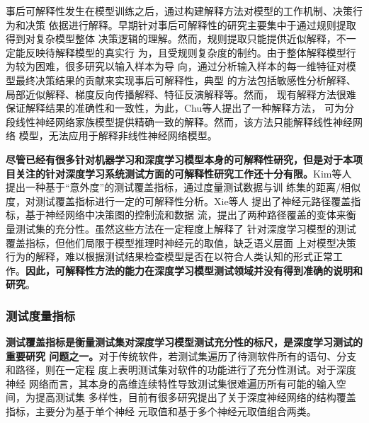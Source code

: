 事后可解释性发生在模型训练之后，通过构建解释方法对模型的工作机制、决策行为和决策
依据进行解释。早期针对事后可解释性的研究主要集中于通过规则提取得到对复杂模型整体
决策逻辑的理解。然而，规则提取只能提供近似解释，不一定能反映待解释模型的真实行
为，且受规则复杂度的制约。由于整体解释模型行为较为困难，很多研究以输入样本为导
向，通过分析输入样本的每一维特征对模型最终决策结果的贡献来实现事后可解释性，典型
的方法包括敏感性分析解释、局部近似解释、梯度反向传播解释、特征反演解释等。然而，
现有解释方法很难保证解释结果的准确性和一致性，为此，Chu等人提出了一种解释方法，
可为分段线性神经网络家族模型提供精确一致的解释。然而，该方法只能解释线性神经网络
模型，无法应用于解释非线性神经网络模型。

\textbf{尽管已经有很多针对机器学习和深度学习模型本身的可解释性研究，但是对于本项
目关注的针对深度学习系统测试方面的可解释性研究工作还十分有限。}Kim等人
提出一种基于“意外度”的测试覆盖指标，通过度量测试数据与训
练集的距离/相似度，对测试覆盖指标进行一定的可解释性分析。Xie等人
提出了神经元路径覆盖指标，基于神经网络中决策图的控制流和数据
流，提出了两种路径覆盖的变体来衡量测试集的充分性。虽然这些方法在一定程度上解释了
针对深度学习模型的测试覆盖指标，但他们局限于模型推理时神经元的取值，缺乏语义层面
上对模型决策行为的解释，难以根据测试结果检查模型是否在以符合人类认知的形式正常工
作。\textbf{因此，可解释性方法的能力在深度学习模型测试领域并没有得到准确的说明和
研究}。

\iffalse
\textbf{尽管已经有很多针对机器学习和深度学习模型本身的可解释性研究，但是对于本项
目关注的针对深度学习系统测试方面的可解释性研究工作还十分有限。}Kim等人
\citess{Kim2019Guiding}提出一种基于“意外度”的测试覆盖指标，通过度量测试数据与训
练集的不同距离，评估测试集对样本输入空间的覆盖度，从而对测试目标进行一定的可解释
性分析。Xie等人\citess{Xie2021NPC}提出了神经元路径覆盖指标，类似于传统的程序控制
流图，首先从深度神经网络中提取决策图用来表示模型的决策逻辑，然后基于决策图的控制
流和数据流，该方法提出了两种路径覆盖的变体来衡量测试数据在执行决策逻辑时的充分
性。该测试方法在一定程度上反映出模型的决策逻辑，但由于模型本身缺乏可解释性，难以
从控制流或数据流路径上辅助开发人员找到模型失效的原因，从而帮助修复模型。但是该方
法依赖于模型推理过程中的神经元取值，缺乏对模型决策行为的解释，难以检查模型是否在
以符合人类认知的形式正常工作。
\fi

\subsubsection{测试度量指标}
\textbf{测试覆盖指标是衡量测试集对深度学习模型测试充分性的标尺，是深度学习测试的重要研究
问题之一。}对于传统软件，若测试集遍历了待测软件所有的语句、分支和路径，则在一定程
度上表明测试集对软件的功能进行了充分性测试。对于深度神经
网络而言，其本身的高维连续特性导致测试集很难遍历所有可能的输入空间，为提高测试集
多样性，目前有很多研究提出了关于深度神经网络的结构覆盖指标，主要分为基于单个神经
元取值和基于多个神经元取值组合两类。


